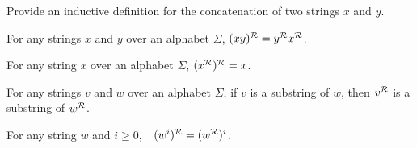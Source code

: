\begin{exer}
Provide an inductive definition for the concatenation of two strings $x$ and $y$.
\end{exer}

\begin{stmt}
For any strings $x$ and $y$ over an alphabet $\Sigma$, $(xy)^{\mathcal{R}} = y^{\mathcal{R}}x^{\mathcal{R}}$.
\end{stmt}

\begin{stmt}
For any string $x$ over an alphabet $\Sigma$, $(x^{\mathcal{R}})^{\mathcal{R}} = x$.
\end{stmt}

\begin{stmt}
For any strings $v$ and $w$ over an alphabet $\Sigma$, if $v$ is a substring of $w$, then $v^{\mathcal{R}}$ is a substring of $w^{\mathcal{R}}$.
\end{stmt}

\begin{stmt}
For any string $w$ and $i \geq 0$,\ \ $(w^i)^{\mathcal{R}} = (w^{\mathcal{R}})^i$.
\end{stmt}

